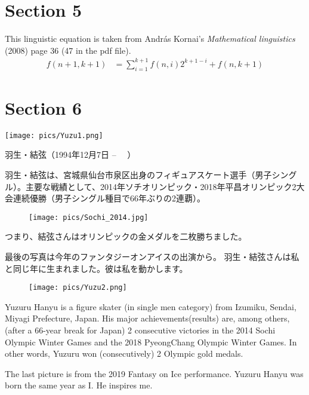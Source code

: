 \documentclass{article}
\begin{document}
\section{Section 5}
This linguistic equation is taken from András Kornai's \textit{Mathematical linguistics} (2008) page 36 (47 in the pdf file).
\newline
{}
\begin{align*}
f(n+1,k+1) &= \sum_{i=1}^{k+1} f(n,i)2^{k+1-i} + f(n,k+1)
\end{align*}

\section{Section 6}
\texttt{[image: pics/Yuzu1.png]}
\begin{CJK}{UTF8}{min}
羽生・結弦（1994年12月7日 -- 　）
\end{CJK} 
\newline

\begin{CJK}{UTF8}{min}
羽生・結弦は、宮城県仙台市泉区出身のフィギュアスケート選手（男子シングル）。主要な戦績として、2014年ソチオリンピック・2018年平昌オリンピック2大会連続優勝（男子シングル種目で66年ぶりの2連覇）。
\begin{wrapfigure}{r}{0.45\textwidth} 
    \centering
    \texttt{[image: pics/Sochi\_2014.jpg]}
\end{wrapfigure}
つまり、結弦さんはオリンピックの金メダルを二枚勝ちました。
\newpage
\newline

最後の写真は今年のファンタジーオンアイスの出演から。
羽生・結弦さんは私と同じ年に生まれました。彼は私を動かします。
\end{CJK}
\newline
\begin{wrapfigure}{r}{0.35\textwidth} 
    \centering
    \texttt{[image: pics/Yuzu2.png]}
\end{wrapfigure}
Yuzuru Hanyu is a figure skater (in single men category) from Izumiku, Sendai, Miyagi Prefecture, Japan. His major achievements(results) are, among others, (after a 66-year break for Japan) 2 consecutive victories in the 2014 Sochi Olympic Winter Games and the 2018 PyeongChang Olympic Winter Games. 
\newline
In other words, Yuzuru won (consecutively) 2 Olympic gold medals. \newline

The last picture is from the 2019 Fantasy on Ice performance. Yuzuru Hanyu was born the same year as I. He inspires me.
\end{document}
